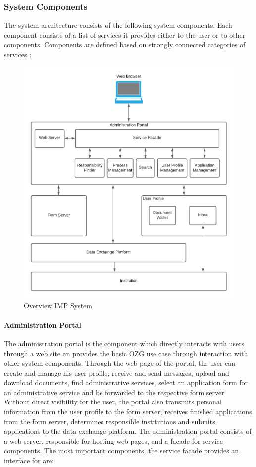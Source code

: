 \subsubsection{System Components}
The system architecture consists of the following system components. Each component consists of a list of services it provides either to the user or to other components. Components are defined based on strongly connected categories of services \cite{NRW:Umsetzung}:

\begin{figure}[h]
\caption{Overview IMP System}
    \centering
    \includegraphics[scale=0.25]{Diagrams/OZG System Overview.png}
\end{figure}

\paragraph{Administration Portal}
The administration portal is the component which directly interacts with users through a web site an provides the basic OZG use case through interaction with other system components. Through the web page of the portal, the user can create and manage his user profile, receive and send messages, upload and download documents, find administrative services, select an application form for an administrative service and be forwarded to the respective form server. Without direct visibility for the user, the portal also transmits personal information from the user profile to the form server, receives finished applications from the form server, determines responsible institutions and submits applications to the data exchange platform.
The administration portal consists of a web server, responsible for hosting web pages, and a facade for service components. The most important components, the service facade provides an interface for are:

